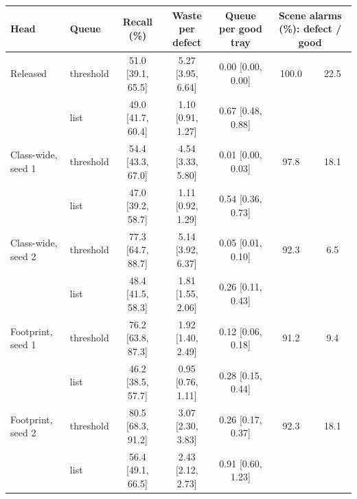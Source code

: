 \begin{tabular}{llccccc}
\toprule
Head & Queue & Recall (\%) & Waste per defect & Queue per good tray & \multicolumn{2}{c}{Scene alarms (\%): defect / good} \\
\midrule
Released & threshold & 51.0 [39.1, 65.5] & 5.27 [3.95, 6.64] & 0.00 [0.00, 0.00] & 100.0 & 22.5 \\
 & list & 49.0 [41.7, 60.4] & 1.10 [0.91, 1.27] & 0.67 [0.48, 0.88] &  &  \\
\midrule
Class-wide, seed 1 & threshold & 54.4 [43.3, 67.0] & 4.54 [3.33, 5.80] & 0.01 [0.00, 0.03] & 97.8 & 18.1 \\
 & list & 47.0 [39.2, 58.7] & 1.11 [0.92, 1.29] & 0.54 [0.36, 0.73] &  &  \\
\midrule
Class-wide, seed 2 & threshold & 77.3 [64.7, 88.7] & 5.14 [3.92, 6.37] & 0.05 [0.01, 0.10] & 92.3 & 6.5 \\
 & list & 48.4 [41.5, 58.3] & 1.81 [1.55, 2.06] & 0.26 [0.11, 0.43] &  &  \\
\midrule
Footprint, seed 1 & threshold & 76.2 [63.8, 87.3] & 1.92 [1.40, 2.49] & 0.12 [0.06, 0.18] & 91.2 & 9.4 \\
 & list & 46.2 [38.5, 57.7] & 0.95 [0.76, 1.11] & 0.28 [0.15, 0.44] &  &  \\
\midrule
Footprint, seed 2 & threshold & 80.5 [68.3, 91.2] & 3.07 [2.30, 3.83] & 0.26 [0.17, 0.37] & 92.3 & 18.1 \\
 & list & 56.4 [49.1, 66.5] & 2.43 [2.12, 2.73] & 0.91 [0.60, 1.23] &  &  \\
\bottomrule
\end{tabular}
